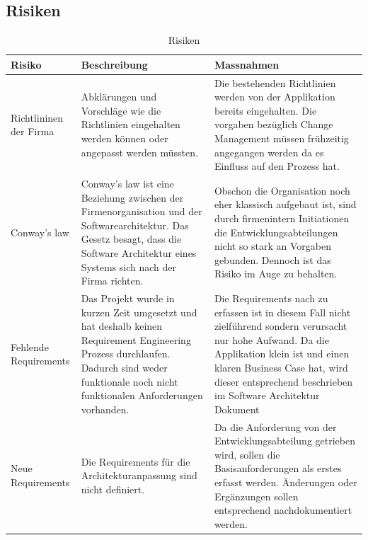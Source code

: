 \begin{landscape}
\section{Risiken}
\begin{table}[h!]
	\centering
	\caption{Risiken}
	\begin{tabular}{ | p{2cm} | p{10cm} | p{10cm} | }
		\toprule
		{\textbf{Risiko}} & {\textbf{Beschreibung}} & {\textbf{Massnahmen}} \\
		\midrule
		Richtlininen der Firma & Abklärungen und Vorschläge wie die Richtlinien eingehalten werden können oder angepasst werden müssten. & Die bestehenden Richtlinien werden von der Applikation bereits eingehalten. Die vorgaben bezüglich Change Management müssen frühzeitig angegangen werden da es Einfluss auf den Prozess hat. \\ \hline
		Conway's law & Conway's law ist eine Beziehung zwischen der Firmenorganisation und der Softwarearchitektur. Das Gesetz besagt, dass die Software Architektur eines Systems sich nach der Firma richten. & Obschon die Organisation noch eher klassisch aufgebaut ist, sind durch firmenintern Initiationen die Entwicklungsabteilungen nicht so stark an Vorgaben gebunden. Dennoch ist das Risiko im Auge zu behalten. \\ \hline
		Fehlende Requirements & Das Projekt wurde in kurzen Zeit umgesetzt und hat deshalb keinen Requirement Engineering Prozess durchlaufen. Dadurch sind weder funktionale noch nicht funktionalen Anforderungen vorhanden. & Die Requirements nach zu erfassen ist in diesem Fall nicht zielführend sondern verursacht nur hohe Aufwand. Da die Applikation klein ist und einen klaren Business Case hat,  wird dieser entsprechend beschrieben im Software Architektur Dokument\\ \hline
		Neue Requirements & Die Requirements für die Architekturanpassung sind nicht definiert. & Da die Anforderung von der Entwicklungsabteilung getrieben wird, sollen die Basisanforderungen als erstes erfasst werden. Änderungen oder Ergänzungen sollen entsprechend nachdokumentiert werden.\\
		\bottomrule
	\end{tabular}
\end{table}

\end{landscape}
\restoregeometry